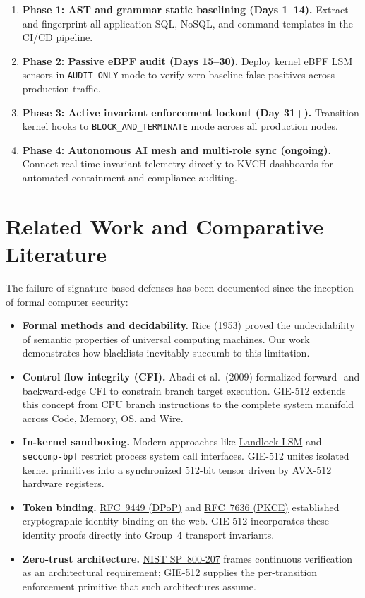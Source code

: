 \documentclass{portalciencia}
\newcommand{\linkrfcdpop}{%
  \href{https://www.rfc-editor.org/rfc/rfc9449}{RFC~9449 (DPoP)}%
}
\newcommand{\linkrfcpkce}{%
  \href{https://www.rfc-editor.org/rfc/rfc7636}{RFC~7636 (PKCE)}%
}
\newcommand{\linklandlock}{%
  \href{https://docs.kernel.org/userspace-api/landlock.html}{Landlock LSM}%
}
\newcommand{\linknistzt}{%
  \href{https://csrc.nist.gov/pubs/sp/800/207/final}{NIST SP~800-207}%
}
\theoremstyle{plain}
\theoremstyle{definition}
\begin{document}
\begin{enumerate}
  \item \textbf{Phase 1: AST and grammar static baselining (Days 1--14).} Extract and fingerprint all application SQL, NoSQL, and command templates in the CI/CD pipeline.
  \item \textbf{Phase 2: Passive eBPF audit (Days 15--30).} Deploy kernel eBPF LSM sensors in \texttt{AUDIT\_ONLY} mode to verify zero baseline false positives across production traffic.
  \item \textbf{Phase 3: Active invariant enforcement lockout (Day 31+).} Transition kernel hooks to \texttt{BLOCK\_AND\_TERMINATE} mode across all production nodes.
  \item \textbf{Phase 4: Autonomous AI mesh and multi-role sync (ongoing).} Connect real-time invariant telemetry directly to KVCH dashboards for automated containment and compliance auditing.
\end{enumerate}

\section{Related Work and Comparative Literature}

The failure of signature-based defenses has been documented since the inception of formal computer security:
\begin{itemize}
  \item \textbf{Formal methods and decidability.} Rice (1953) proved the undecidability of semantic properties of universal computing machines. Our work demonstrates how blacklists inevitably succumb to this limitation.
  \item \textbf{Control flow integrity (CFI).} Abadi et al.\ (2009) formalized forward- and backward-edge CFI to constrain branch target execution. GIE-512 extends this concept from CPU branch instructions to the complete system manifold across Code, Memory, OS, and Wire.
  \item \textbf{In-kernel sandboxing.} Modern approaches like \linklandlock{} and \texttt{seccomp-bpf} restrict process system call interfaces. GIE-512 unites isolated kernel primitives into a synchronized 512-bit tensor driven by AVX-512 hardware registers.
  \item \textbf{Token binding.} \linkrfcdpop{} and \linkrfcpkce{} established cryptographic identity binding on the web. GIE-512 incorporates these identity proofs directly into Group~4 transport invariants.
  \item \textbf{Zero-trust architecture.} \linknistzt{} frames continuous verification as an architectural requirement; GIE-512 supplies the per-transition enforcement primitive that such architectures assume.
\end{itemize}
\end{document}
